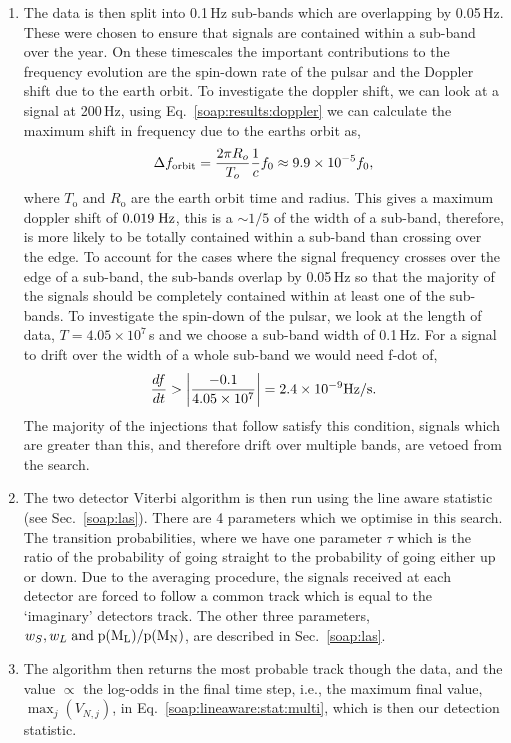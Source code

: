 \begin{enumerate}
\item The data is then split into 0.1\,Hz sub-bands which are overlapping by 0.05\,Hz. These were chosen to ensure that signals are contained within a sub-band over the year. On these timescales the important contributions to the frequency evolution are the spin-down rate of the pulsar and the Doppler shift due to the earth orbit.
To investigate the doppler shift, we can look at a signal at 200\,Hz, using Eq.~\ref{soap:results:doppler} we can calculate the maximum shift in frequency due to the earths orbit as,
%
\begin{equation}
\label{soap:results:dforbit}
\Delta f_{\rm orbit} = \frac{2 \pi R_o}{T_o} \frac{1}{c} f_0 \approx 9.9 \times 10^{-5} f_0,
\end{equation}
%
where $T_{\text{o}}$ and $R_{\text{o}}$ are the
earth orbit time and radius. This gives a maximum doppler shift of $0.019 \; \rm{Hz}$, this is a $\sim 1/5$ of the width of a sub-band, therefore, is more likely to be totally contained within a sub-band than crossing over the edge.
To account for the cases where the signal frequency crosses over the edge of a sub-band, the sub-bands overlap by 0.05\,Hz so that the majority of the signals should be completely contained within at least one of the sub-bands.
To investigate the spin-down of the pulsar, we look at the length of data, $T=4.05 \times 10^7$\,s and we choose a sub-band width of 0.1\,Hz. For a signal to drift over the width of a whole sub-band we would need f-dot of,
\begin{equation}
\frac{df}{dt} > \left|\frac{-0.1}{4.05 \times 10^7}\right| = 2.4 \times 10^{-9} \rm{Hz/s}.
\end{equation}
The majority of the injections that follow satisfy this condition, signals which are greater than this, and therefore drift over multiple bands, are vetoed from the search.
%
\item The two detector Viterbi algorithm is then run using the line aware
statistic (see Sec.~\ref{soap:las}). There are 4 parameters which we optimise in this search. The transition probabilities, where we have one parameter $\tau$ which is the ratio of the probability
of going straight to the probability of going either up or down. Due to the averaging
procedure, the signals received at each detector are forced to follow a common track which is equal to the `imaginary' detectors track. The other three parameters, $w_S, w_L \; \rm{and} \; p(M_L)/p(M_N)$, are described in Sec.~\ref{soap:las}.
%
\item The algorithm then returns the most probable track though the data, and the value
$\propto$ the log-odds in the final time step, i.e., the
maximum final value, $\max_j(V_{N,j})$, in Eq.~\ref{soap:lineaware:stat:multi}, which is then our detection statistic.

%
\end{enumerate}

